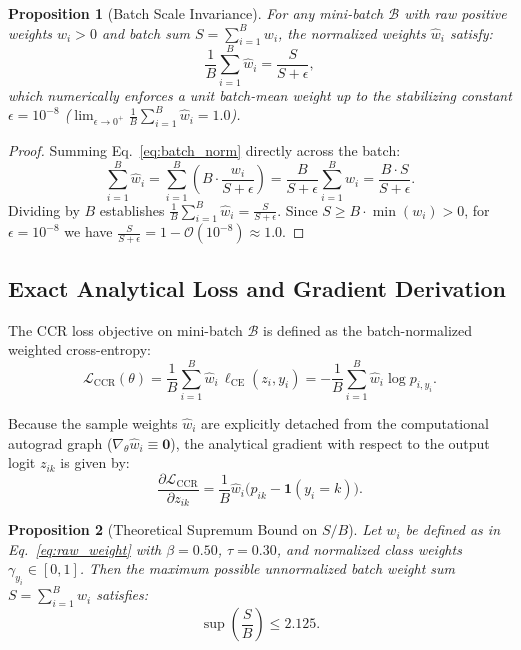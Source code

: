 \documentclass[preprint,12pt]{elsarticle}
\newcommand{\indicator}{\mathbf{1}}
\newcommand{\CCR}{\mathcal{L}_{\mathrm{CCR}}}
\newcommand{\CE}{\ell_{\mathrm{CE}}}
\newtheorem{proposition}{Proposition}
\begin{document}
\begin{proposition}[Batch Scale Invariance]
\label{prop:scale_invariance}
For any mini-batch $\mathcal{B}$ with raw positive weights $w_i > 0$ and batch sum $S = \sum_{i=1}^B w_i$, the normalized weights $\hat{w}_i$ satisfy:
\begin{equation}
\frac{1}{B}\sum_{i=1}^B \hat{w}_i = \frac{S}{S + \epsilon},
\end{equation}
which numerically enforces a unit batch-mean weight up to the stabilizing constant $\epsilon = 10^{-8}$ ($\lim_{\epsilon \to 0^+} \frac{1}{B}\sum_{i=1}^B \hat{w}_i = 1.0$).
\end{proposition}

\begin{proof}
Summing Eq.~\ref{eq:batch_norm} directly across the batch:
\begin{equation}
\sum_{i=1}^B \hat{w}_i = \sum_{i=1}^B \left( B \cdot \frac{w_i}{S + \epsilon} \right) = \frac{B}{S + \epsilon} \sum_{i=1}^B w_i = \frac{B \cdot S}{S + \epsilon}.
\end{equation}
Dividing by $B$ establishes $\frac{1}{B}\sum_{i=1}^B \hat{w}_i = \frac{S}{S + \epsilon}$. Since $S \ge B \cdot \min(w_i) > 0$, for $\epsilon = 10^{-8}$ we have $\frac{S}{S+\epsilon} = 1 - \mathcal{O}(10^{-8}) \approx 1.0$.
\end{proof}

\subsection{Exact Analytical Loss and Gradient Derivation}

The CCR loss objective on mini-batch $\mathcal{B}$ is defined as the batch-normalized weighted cross-entropy:
\begin{equation}
\label{eq:ccr_loss}
\CCR(\theta) = \frac{1}{B}\sum_{i=1}^B \hat{w}_i \, \CE(z_i, y_i) = -\frac{1}{B}\sum_{i=1}^B \hat{w}_i \log p_{i, y_i}.
\end{equation}

Because the sample weights $\hat{w}_i$ are explicitly detached from the computational autograd graph ($\nabla_\theta \hat{w}_i \equiv \mathbf{0}$), the analytical gradient with respect to the output logit $z_{ik}$ is given by:
\begin{equation}
\label{eq:gradient}
\frac{\partial \CCR}{\partial z_{ik}} = \frac{1}{B} \hat{w}_i \Big( p_{ik} - \indicator(y_i = k) \Big).
\end{equation}

\begin{proposition}[Theoretical Supremum Bound on $S/B$]
\label{prop:supremum}
Let $w_i$ be defined as in Eq.~\ref{eq:raw_weight} with $\beta = 0.50$, $\tau = 0.30$, and normalized class weights $\gamma_{y_i} \in [0, 1]$. Then the maximum possible unnormalized batch weight sum $S = \sum_{i=1}^B w_i$ satisfies:
\begin{equation}
\sup \left( \frac{S}{B} \right) \le 2.125.
\end{equation}
\end{proposition}
\end{document}

